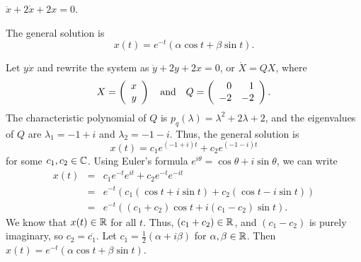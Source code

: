 \documentclass{ximera}
\begin{document}
\begin{exercise} \label{c6.6.hoc}
$\ddot{x} + 2\dot{x} + 2x = 0$.

\begin{solution}

\ans The general solution is
\[
x(t) = e^{-t}(\alpha \cos{t} + \beta \sin{t}).
\]

\soln Let $y \dot{x}$ and rewrite the system as $\dot{y} + 2y + 2x = 0$,
or $\dot{X} = QX$, where
\[
X = \left(\begin{array}{r} x \\ y\end{array}\right) \quad\mbox{and}\quad Q = \left(\begin{array}{rr} 0 & 1\\ -2 &-2\end{array}\right).
\]
The characteristic polynomial of $Q$ is $p_q(\lambda) = \lambda^2 
+ 2\lambda + 2$, and the eigenvalues of $Q$ are $\lambda_1 = -1 + i$ and
$\lambda_2 = -1 - i$.  Thus, the general solution is
\[
x(t) = c_1e^{(-1 + i)t} + c_2e^{(-1 - i)t}
\]
for some $c_1, c_2 \in \mbox{$\Bbb{C}$}$.  Using Euler's formula $e^{i\theta} =
\cos\theta + i\sin\theta$, we can write
\[
\begin{array}{rcl}
x(t) & = & c_1e^{-t}e^{it} + c_2e^{-t}e^{-it} \\
& = & e^{-t}(c_1(\cos{t} + i\sin{t}) + c_2(\cos{t} - i\sin{t})) \\
& = & e^{-t}((c_1 + c_2)\cos{t} + i(c_1 - c_2)\sin{t}).
\end{array}
\]
We know that $x(t) \in \mbox{$\Bbb{R}$}$ for all $t$.  Thus, $(c_1 + c_2) \in \mbox{$\Bbb{R}$}$, and
$(c_1 - c_2)$ is purely imaginary, so $c_2 = \overline{c_1}$.  Let
$c_1 = \frac{1}{2}(\alpha + i\beta)$ for $\alpha, \beta \in \mbox{$\Bbb{R}$}$. 
Then $x(t) = e^{-t}(\alpha\cos{t} + \beta\sin{t})$.

\end{solution}
\end{exercise}
\end{document}
